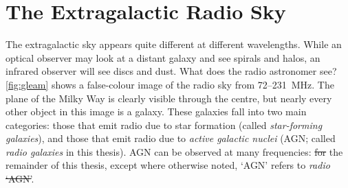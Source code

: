 \documentclass[11pt, a4paper]{book}
\newcommand{\defn}[1]{\emph{#1}}
\providecommand{\DIFaddtex}[1]{{\protect\color{blue}\uwave{#1}}} %
\providecommand{\DIFdeltex}[1]{{\protect\color{red}\sout{#1}}}                      %
\providecommand{\DIFaddbegin}{} %
\providecommand{\DIFaddend}{} %
\providecommand{\DIFdelbegin}{} %
\providecommand{\DIFdelend}{} %
\providecommand{\DIFadd}[1]{\texorpdfstring{\DIFaddtex{#1}}{#1}} %
\providecommand{\DIFdel}[1]{\texorpdfstring{\DIFdeltex{#1}}{}} %
\newcommand{\DIFscaledelfig}{0.5}
\newlength{\DIFdelgraphicswidth} %
\newlength{\DIFdelgraphicsheight} %
\newcommand{\DIFaddincludegraphics}[2][]{{\color{blue}\fbox{\DIFOincludegraphics[#1]{#2}}}} %
\newcommand{\DIFdelincludegraphics}[2][]{%
\sbox{\DIFdelgraphicsbox}{\DIFOincludegraphics[#1]{#2}}%
\settoboxwidth{\DIFdelgraphicswidth}{\DIFdelgraphicsbox} %
\settoboxtotalheight{\DIFdelgraphicsheight}{\DIFdelgraphicsbox} %
\scalebox{\DIFscaledelfig}{%
\parbox[b]{\DIFdelgraphicswidth}{\usebox{\DIFdelgraphicsbox}\\[-\baselineskip] \rule{\DIFdelgraphicswidth}{0em}}\llap{\resizebox{\DIFdelgraphicswidth}{\DIFdelgraphicsheight}{%
\setlength{\unitlength}{\DIFdelgraphicswidth}%
\begin{picture}(1,1)%
\thicklines\linethickness{2pt} %
{\color[rgb]{1,0,0}\put(0,0){\framebox(1,1){}}}%
{\color[rgb]{1,0,0}\put(0,0){\line( 1,1){1}}}%
{\color[rgb]{1,0,0}\put(0,1){\line(1,-1){1}}}%
\end{picture}%
}\hspace*{3pt}}} %
} %
\DeclareRobustCommand{\DIFaddbegin}{\DIFOaddbegin \let\includegraphics\DIFaddincludegraphics} %
\DeclareRobustCommand{\DIFaddend}{\DIFOaddend \let\includegraphics\DIFOincludegraphics} %
\DeclareRobustCommand{\DIFdelbegin}{\DIFOdelbegin \let\includegraphics\DIFdelincludegraphics} %
\DeclareRobustCommand{\DIFdelend}{\DIFOaddend \let\includegraphics\DIFOincludegraphics} %
\begin{document}
\section{The Extragalactic Radio Sky}
\label{sec:extragalactic-radio-sky}

    The extragalactic sky appears quite different at different wavelengths. While an optical observer may look at a distant galaxy and see spirals and halos, an infrared observer will see discs and dust. What does the radio astronomer see? 
    \autoref{fig:gleam} shows a false-colour image of the radio sky from 72--231~MHz. The plane of the Milky Way is clearly visible through the centre, but nearly every other object in this image is a galaxy. These galaxies fall into two main categories: those that emit radio due to star formation (called \defn{star-forming galaxies}), and those that emit radio due to \defn{active galactic nuclei} (AGN; called \defn{radio galaxies} in this thesis). AGN can be observed at many frequencies: \DIFdelbegin \DIFdel{for }\DIFdelend \DIFaddbegin \DIFadd{For }\DIFaddend the remainder of this thesis, except where otherwise noted, `AGN' refers to \emph{radio} \DIFdelbegin \DIFdel{`AGN'}\DIFdelend \DIFaddbegin \DIFadd{AGN}\DIFaddend .
\end{document}
